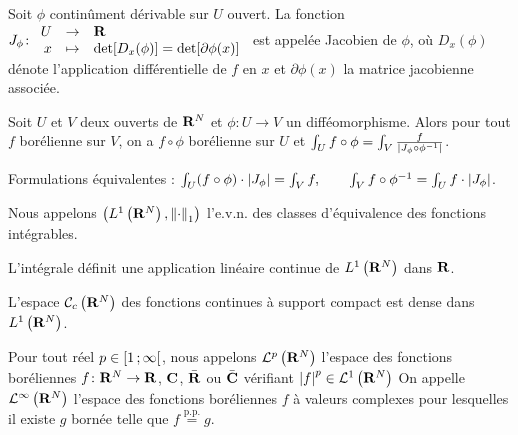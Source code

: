 \begin{defn}
	Soit $\phi$ continûment dérivable sur $U$ ouvert.
	La fonction $J_{\phi} \colon \begin{array}{rcl} U & \to & \mathbf{R} \\ x & \mapsto & \det [D_x(\phi)] = \det [\partial \phi(x)] \end{array}$ est appelée Jacobien de $\phi$, où $D_x(\phi)$ dénote l'application différentielle de $f$ en $x$ et $\partial \phi (x)$ la matrice jacobienne associée.
\end{defn}

\begin{thm}
	Soit $U$ et $V$ deux ouverts de $\mathbf{R}^N$ et $\phi \colon U \to V$ un difféomorphisme.
	Alors pour tout $f$ borélienne sur $V$, on a $f \circ \phi$ borélienne sur $U$ et $\int_U f \circ \phi = \int_V \frac{f}{\left\lvert J_\phi \circ \phi^{-1}\right\rvert}$.
\end{thm}

\begin{rem}
	Formulations équivalentes : $\int_U (f \circ \phi) \cdot \left\lvert J_\phi\right\rvert = \int_V f, \qquad \int_V f \circ \phi^{-1} = \int_U f \cdot \left\lvert J_\phi\right\rvert$.
\end{rem}

\begin{defn}
	Nous appelons $\left( L^1 \left( \mathbf{R}^N \right), \left\lVert\cdot\right\rVert_1 \right)$ l'e.v.n. des classes d'équivalence des fonctions intégrables.
\end{defn}

\begin{thm}
	L'intégrale définit une application linéaire continue de $L^1 \left( \mathbf{R}^N \right)$ dans $\mathbf{R}$.
\end{thm}

\begin{thm}
	L'espace $\mathcal{C}_c \left( \mathbf{R}^N \right)$ des fonctions continues à support compact est dense dans $L^1 \left( \mathbf{R}^N \right)$.
\end{thm}

\begin{defn}
	Pour tout réel $p \in \mathopen{}\mathclose{\left[1\mathclose{}\mathpunct{};\infty\right[}$, nous appelons $\mathcal{L}^p \left( \mathbf{R}^N \right)$ l'espace des fonctions boréliennes $f \colon \mathbf{R}^N \to \mathbf{R}$, $\mathbf{C}$, $\bar{\mathbf{R}}$ ou $\bar{\mathbf{C}}$ vérifiant $\left\lvert f\right\rvert^p \in \mathcal{L}^1 \left( \mathbf{R}^N \right)$
	On appelle $\mathcal{L}^{\infty} \left( \mathbf{R}^N \right)$ l'espace des fonctions boréliennes $f$ à valeurs complexes pour lesquelles il existe $g$ bornée telle que $f \overset{\text{p.p.}}{=} g$.
\end{defn}

